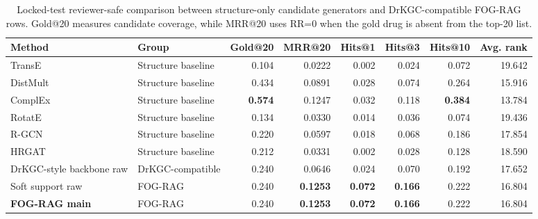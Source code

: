 \begin{table}[!t]
\centering
\scriptsize
\setlength{\tabcolsep}{3.5pt}
\renewcommand{\arraystretch}{1.08}
\begin{adjustbox}{max width=\textwidth}
\begin{tabular}{llrrrrrr}
\toprule
Method & Group & Gold@20 & MRR@20 & Hits@1 & Hits@3 & Hits@10 & Avg. rank \\
\midrule
TransE & Structure baseline & 0.104 & 0.0222 & 0.002 & 0.024 & 0.072 & 19.642 \\
DistMult & Structure baseline & 0.434 & 0.0891 & 0.028 & 0.074 & 0.264 & 15.916 \\
ComplEx & Structure baseline & \textbf{0.574} & 0.1247 & 0.032 & 0.118 & \textbf{0.384} & 13.784 \\
RotatE & Structure baseline & 0.134 & 0.0330 & 0.014 & 0.036 & 0.074 & 19.436 \\
R-GCN & Structure baseline & 0.220 & 0.0597 & 0.018 & 0.068 & 0.186 & 17.854 \\
HRGAT & Structure baseline & 0.212 & 0.0331 & 0.002 & 0.028 & 0.128 & 18.590 \\
\midrule
DrKGC-style backbone raw & DrKGC-compatible & 0.240 & 0.0646 & 0.024 & 0.070 & 0.192 & 17.652 \\
Soft support raw & FOG-RAG & 0.240 & \textbf{0.1253} & \textbf{0.072} & \textbf{0.166} & 0.222 & 16.804 \\
\textbf{FOG-RAG main} & FOG-RAG & 0.240 & \textbf{0.1253} & \textbf{0.072} & \textbf{0.166} & 0.222 & 16.804 \\
\bottomrule
\end{tabular}
\end{adjustbox}
\caption{Locked-test reviewer-safe comparison between structure-only candidate generators and DrKGC-compatible FOG-RAG rows. Gold@20 measures candidate coverage, while MRR@20 uses RR=0 when the gold drug is absent from the top-20 list.}
\label{tab:week21-baseline-main}
\end{table}
